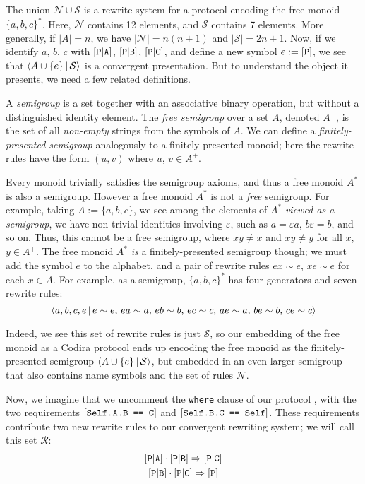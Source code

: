 \documentclass[../generics]{subfiles}
\begin{document}
\begin{example}
The union $\mathcal{N}\cup\mathcal{S}$ is a rewrite system for a protocol encoding the free monoid $\{a,b,c\}^*$. Here, $\mathcal{N}$ contains 12 elements, and $\mathcal{S}$ contains 7 elements. More generally, if $|A|=n$, we have $|\mathcal{N}|=n(n+1)$ and $|\mathcal{S}|=2n+1$. Now, if we identify $a$, $b$, $c$ with $[\texttt{P}|\texttt{A}]$, $[\texttt{P}|\texttt{B}]$, $[\texttt{P}|\texttt{C}]$, and define a new symbol $e:=[\texttt{P}]$, we see that $\langle A\cup\{e\}\,|\,\mathcal{S}\rangle$ is a convergent presentation. But to understand the object it presents, we need a few related definitions.

A \emph{semigroup} is a set together with an associative binary operation, but without a distinguished identity element. The \emph{free semigroup} over a set $A$, denoted $A^+$, is the set of all \emph{non-empty} strings from the symbols of $A$. We can define a \emph{finitely-presented semigroup} analogously to a finitely-presented monoid; here the rewrite rules have the form $(u,v)$ where $u$, $v\in A^+$.

Every monoid trivially satisfies the semigroup axioms, and thus a free monoid $A^*$ is also a semigroup. However a free monoid $A^*$ is not a \emph{free} semigroup. For example, taking $A:=\{a,b,c\}$, we see among the elements of $A^*$ \emph{viewed as a semigroup}, we have non-trivial identities involving $\varepsilon$, such as $a=\varepsilon a$, $b\varepsilon=b$, and so on. Thus, this cannot be a free semigroup, where $xy\neq x$ and $xy\neq y$ for all $x$, $y\in A^+$. The free monoid $A^*$ \emph{is} a finitely-presented semigroup though; we must add the symbol $e$ to the alphabet, and a pair of rewrite rules $ex\sim e$, $xe\sim e$ for each $x\in A$. For example, as a semigroup, $\{a,b,c\}^*$ has four generators and seven rewrite rules:
\[\langle a,b,c,e\,|\,e\sim e,\,ea\sim a,\,eb\sim b,\,ec\sim c,\,ae\sim a,\,be\sim b,\,ce\sim c\rangle\]

Indeed, we see this set of rewrite rules is just $\mathcal{S}$, so our embedding of the free monoid as a Codira protocol ends up encoding the free monoid as the finitely-presented semigroup $\langle A\cup\{e\}\,|\,\mathcal{S}\rangle$, but embedded in an even larger semigroup that also contains name symbols and the set of rules $\mathcal{N}$.

Now, we imagine that we uncomment the \texttt{where} clause of our protocol \tP, with the two requirements $[\texttt{Self.A.B == C}]$ and $[\texttt{Self.B.C == Self}]$. These requirements contribute two new rewrite rules to our convergent rewriting system; we will call this set $\mathcal{R}$:
\begin{gather*}
\aPA\cdot\aPB\Rightarrow\aPC\\
\aPB\cdot\aPC\Rightarrow\pP
\end{gather*}


\end{example}
\end{document}
